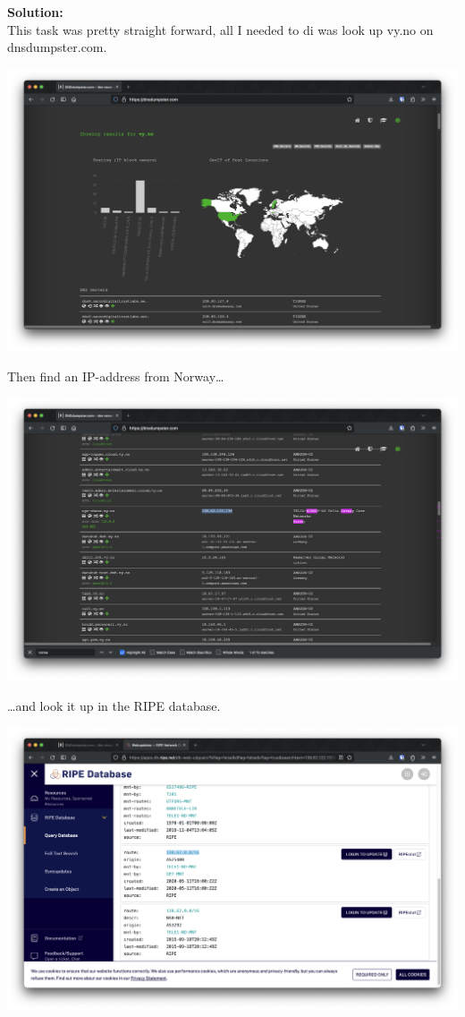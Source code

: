 \textbf{Solution:}\\
This task was pretty straight forward, all I needed to di was look up vy.no on dnsdumpster.com.

\includegraphics[width=15cm]{img/Technical information gathering/Vy/Skjermbilde 2023-09-01 kl. 14.56.00.png}

Then find an IP-address from Norway\dots

\includegraphics[width=15cm]{img/Technical information gathering/Vy/Skjermbilde 2023-09-01 kl. 14.56.23.png}

\dots and look it up in the RIPE database.

\includegraphics[width=15cm]{img/Technical information gathering/Vy/Skjermbilde 2023-09-01 kl. 14.56.50.png}